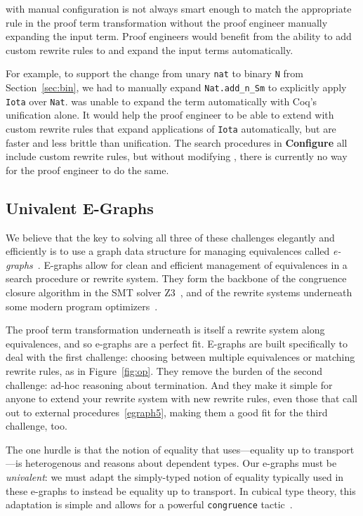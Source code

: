 \toolname with manual configuration is not always smart enough to match the appropriate rule in the proof term
transformation without the proof engineer manually expanding the input term.
Proof engineers would benefit from the ability to add custom rewrite rules to \toolname
and expand the input terms automatically.

For example, to support the change from unary \lstinline{nat} to binary \lstinline{N}
from Section~\ref{sec:bin}, we had to manually expand \lstinline{Nat.add_n_Sm}
to explicitly apply \lstinline{Iota} over \lstinline{Nat}.
\toolname was unable to expand the term automatically with Coq's unification alone.
It would help the proof engineer to be able to extend \toolname with custom rewrite
rules that expand applications of \lstinline{Iota} automatically, but are faster and less brittle than unification.
The search procedures in \textbf{Configure} all include custom rewrite rules, but
without modifying \toolname, there is currently no way for the proof engineer to do the same.

\subsection{Univalent E-Graphs}
\label{sec:egraph}

We believe that the key to solving all three of these challenges elegantly and efficiently is to use
a graph data structure for managing equivalences called \textit{e-graphs}~\cite{egraph1}.
E-graphs allow for clean and efficient management of equivalences in a search procedure or rewrite system.
They form the backbone of the congruence closure algorithm in the SMT solver Z3~\cite{egraph4},
and of the rewrite systems underneath some modern program optimizers~\cite{egraph2, egraph3}.

The proof term transformation underneath \toolname is itself a rewrite system along equivalences,
and so e-graphs are a perfect fit.
E-graphs are built specifically to deal with the first challenge:
choosing between multiple equivalences or matching rewrite rules,
as in Figure~\ref{fig:op}.
They remove the burden of the second challenge: ad-hoc reasoning about termination.
And they make it simple for anyone to extend your rewrite system with new
rewrite rules, even those that call out
to external procedures~\ref{egraph5}, making them a good fit for the third challenge, too.

The one hurdle is that the notion of equality that \toolname uses---equality up to transport---is heterogenous and reasons 
about dependent types. Our e-graphs must be \textit{univalent}: we must adapt the simply-typed notion of equality typically
used in these e-graphs to instead be equality up to transport.
In cubical type theory, this adaptation is simple and allows for a powerful \lstinline{congruence} tactic~\cite{egraph6}.

